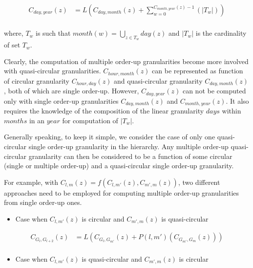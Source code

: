 \documentclass[12pt]{article}
\providecommand{\tightlist}{%
  \setlength{\itemsep}{0pt}\setlength{\parskip}{0pt}}
\begin{document}
\begin{equation} \label{eq:day-year}
\begin{split}
C_{day, year}(z) & = L(C_{day,month}(z) + \sum_{w=0}^{C_{month, year}(z)-1}(\vert T_{w} \vert))\\
\end{split}
\end{equation}

where, \(T_w\) is such that \(month(w) = \bigcup_{z \in T_w}day(z)\) and \(\vert T_w \vert\) is the cardinality of set \(T_w\).

Clearly, the computation of multiple order-up granularities become more involved with quasi-circular granularities. \(C_{hour, month}(z)\) can be represented as function of circular granularity \(C_{hour, day}(z)\) and quasi-circular granularity \(C_{day, month}(z)\), both of which are single order-up. However, \(C_{day, year}(z)\) can not be computed only with single order-up granularities \(C_{day, month}(z)\) and \(C_{month, year}(z)\). It also requires the knowledge of the composition of the linear granularity \(days\) within \(months\) in an \(year\) for computation of \(\vert T_w \vert\).

Generally speaking, to keep it simple, we consider the case of only one quasi-circular single order-up granularity in the hierarchy. Any multiple order-up quasi-circular granularity can then be considered to be a function of some circular (single or multiple order-up) and a quasi-circular single order-up granularity.

For example, with \(C_{l, m}(z) = f(C_{l,m'}(z), C_{m',m}(z))\), two different approaches need to be employed for computing multiple order-up granularities from single order-up ones.

\begin{itemize}
\tightlist
\item
  Case when \(C_{l,m'}(z)\) is circular and \(C_{m',m}(z)\) is quasi-circular
\end{itemize}

\begin{equation} \label{eq:multifromsingle-quasi1}
\begin{split}
C_{G_l,G_{l+2}}(z) & = L(C_{G_{l},G_{m'}}(z) + P(l, m')(C_{G_{m'},G_{m}}(z))) \\
\end{split}
\end{equation}

\begin{itemize}
\tightlist
\item
  Case when \(C_{l,m'}(z)\) is quasi-circular and \(C_{m',m}(z)\) is circular
\end{itemize}
\end{document}

